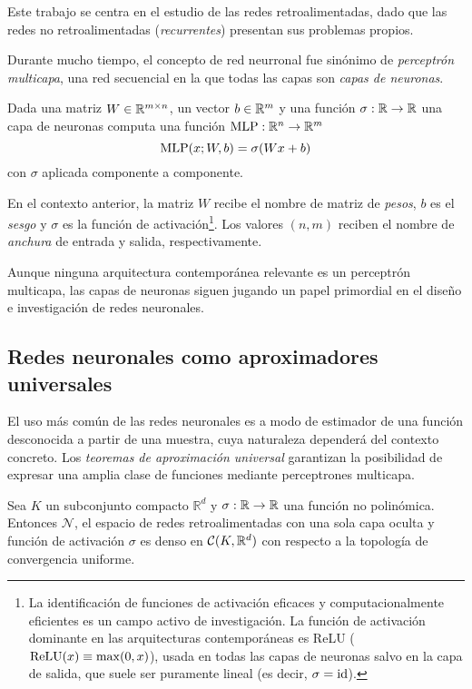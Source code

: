 Este trabajo se centra en el estudio de las redes retroalimentadas, dado que las redes no retroalimentadas (\textit{recurrentes}) presentan sus problemas propios.

Durante mucho tiempo, el concepto de red neurronal fue sinónimo de \textit{perceptrón multicapa}, una red secuencial en la que todas las capas son \textit{capas de neuronas}.

\begin{definition}
    Dada una matriz \( W \in \mathbb{R}^{m \times n} \), un vector \( b \in \mathbb{R}^{m} \) y una función \( \sigma: \mathbb{R} \to \mathbb{R} \) una capa de neuronas computa una función \( \operatorname{MLP}: \mathbb{R}^{n} \to \mathbb{R}^{m} \)
    \[
        \operatorname{MLP}(x; W, b) = \sigma(Wx + b)
    \]
    con \( \sigma \) aplicada componente a componente.

    En el contexto anterior, la matriz \( W \) recibe el nombre de matriz de \textit{pesos}, \( b \) es el \textit{sesgo} y \( \sigma \) es la función de activación\footnote{La identificación de funciones de activación eficaces y computacionalmente eficientes es un campo activo de investigación. La función de activación dominante en las arquitecturas contemporáneas es ReLU (\( \operatorname{ReLU}(x) \equiv \max(0, x) \)), usada en todas las capas de neuronas salvo en la capa de salida, que suele ser puramente lineal (es decir, \( \sigma = \operatorname{id} \)).
    }. Los valores \( (n, m) \) reciben el nombre de \textit{anchura} de entrada y salida, respectivamente.
\end{definition}

Aunque ninguna arquitectura contemporánea relevante es un perceptrón multicapa, las capas de neuronas siguen jugando un papel primordial en el diseño e investigación de redes neuronales.

\subsection{Redes neuronales como aproximadores universales}    
El uso más común de las redes neuronales es a modo de estimador de una función desconocida a partir de una muestra, cuya naturaleza dependerá del contexto concreto. Los \textit{teoremas de aproximación universal} garantizan la posibilidad de expresar una amplia clase de funciones mediante perceptrones multicapa.
\begin{theorem}
Sea \( K \) un subconjunto compacto \( \mathbb{R}^d \) y  \( \sigma: \mathbb{R} \to \mathbb{R} \) una función no polinómica.  Entonces \( \mathcal{N} \), el espacio de redes retroalimentadas con una sola capa oculta y función de activación \( \sigma \)  es denso en \( \mathcal{C} (K, \mathbb{R}^{d}) \) con respecto a la topología de convergencia uniforme.
\end{theorem}

